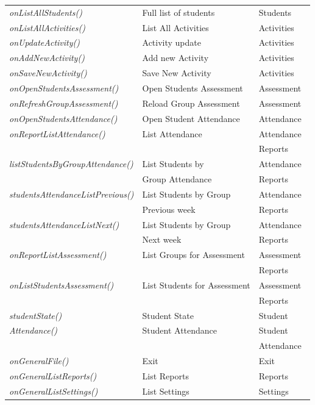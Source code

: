 \begin{bclogo}[couleur=orange!30,logo=\bcbook, arrondi=0.1,ombre=true ]
\begin{tabular}{lll}
\emph{ onListAllStudents()  }    & Full list of students           &  Students \\
\emph{ onListAllActivities()}   & List All Activities             &    Activities \\
\emph{ onUpdateActivity()  }   & Activity update                 &   Activities \\
\emph{ onAddNewActivity()  }   & Add new Activity                &   Activities \\
\emph{ onSaveNewActivity() }    & Save New Activity               &   Activities \\
\emph{ onOpenStudentsAssessment()} & Open Students Assessment        &   Assessment \\
\emph{ onRefreshGroupAssessment()} & Reload Group Assessment         &  Assessment \\
\emph{ onOpenStudentsAttendance() }& Open Student Attendance         & Attendance \\
\emph{ onReportListAttendance() }  & List Attendance                 &  Attendance\ \\
                         &                                   & Reports \\
\emph{ listStudentsByGroupAttendance() } & List Students by             & Attendance \\
    & Group Attendance           &    Reports \\
\emph{ studentsAttendanceListPrevious()} &List Students by Group     &  Attendance\\
    &Previous week                                              & Reports \\

\emph{ studentsAttendanceListNext()} & List Students by Group    & Attendance  \\
    &Next week   &   Reports\\

\emph{ onReportListAssessment() } & List Groups for Assessment      &   Assessment  \\
                         &                                   & Reports \\
  \emph{ onListStudentsAssessment()} & List Students for Assessment    &Assessment  \\
                         &                                   & Reports \\
 \emph{ studentState() }    & Student State       &   Student \\
\emph{ Attendance()}    & Student Attendance &   Student  \\
                 &                  &  Attendance \\
\emph{ onGeneralFile()} &Exit            &  Exit  \\
\emph{ onGeneralListReports()}    & List Reports    &  Reports \\
\emph{ onGeneralListSettings()}  & List Settings   &   Settings \\

\end{tabular}	
\end{bclogo}
	
